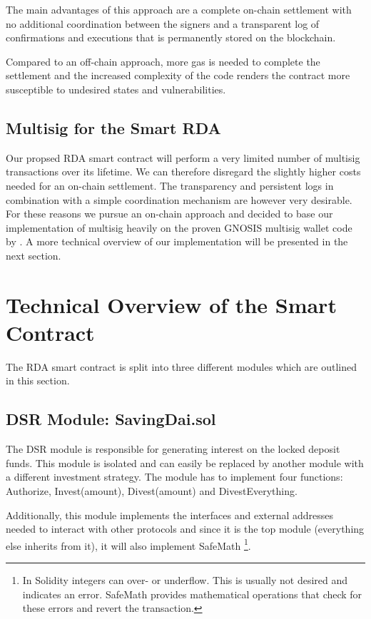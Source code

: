 \documentclass[12pt,a4paper,titlepage,oneside,english]{article}
\begin{document}
The main advantages of this approach are a complete on-chain settlement with no additional coordination between the signers and a transparent log of confirmations and executions that is permanently stored on the blockchain.

Compared to an off-chain approach, more gas is needed to complete the settlement and the increased complexity of the code renders the contract more susceptible to undesired states and vulnerabilities.

\subsection{Multisig for the Smart RDA}
Our propsed RDA smart contract will perform a very limited number of multisig transactions over its lifetime. We can therefore disregard the slightly higher costs needed for an on-chain settlement. The transparency and persistent logs in combination with a simple coordination mechanism are however very desirable. For these reasons we pursue an on-chain approach and decided to base our implementation of multisig heavily on the proven GNOSIS multisig wallet code by \cite{GNOSISLtd.2019}. A more technical overview of our implementation will be presented in the next section.




\section{Technical Overview of the Smart Contract}
\label{sec:contract}
The RDA smart contract is split into three different modules which are outlined in this section.

\subsection{DSR Module: SavingDai.sol}
The DSR module is responsible for generating interest on the locked deposit funds. This module is isolated and can easily be replaced by another module with a different investment strategy. The module has to implement four functions: Authorize, Invest(amount), Divest(amount) and DivestEverything.

Additionally, this module implements the interfaces and external addresses needed to interact with other protocols and since it is the top module (everything else inherits from it), it will also implement SafeMath \footnote{In Solidity integers can over- or underflow. This is usually not desired and indicates an error. SafeMath provides mathematical operations that check for these errors and revert the transaction.}.
\end{document}
